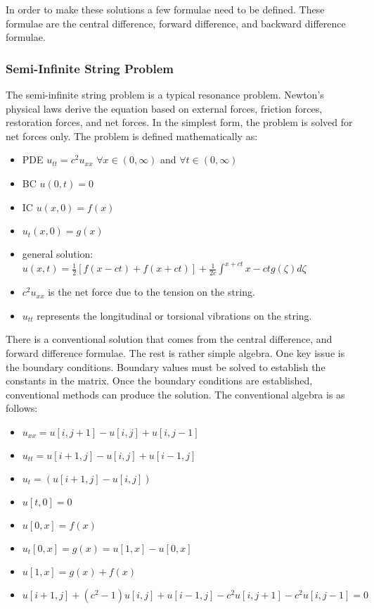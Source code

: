In order to make these solutions a few formulae need to be defined.  These formulae are the central difference, forward difference, and backward difference formulae. 


\subsubsection {Semi-Infinite String Problem}
The semi-infinite string problem is a typical resonance problem.  Newton's physical laws derive the equation based on external forces, friction forces, restoration forces, and net forces.   In the simplest form, the problem is solved for net forces only.  %
The problem is defined mathematically as:

\begin{itemize}
\item PDE $u_{tt} = c^2 u_{xx}$  $\forall x \in (0, \infty)$ and $\forall t \in (0,\infty)$ 
\item BC $u(0,t) = 0$
\item IC $u(x,0)= f(x)$
\item $u_t (x,0) = g(x)$
\item general solution: $ u(x,t) = \frac{1}{2} [ f(x-ct) + f(x+ct)] + \frac{1}{2c} \int ^{x+ct}{x-ct} g(\zeta) d\zeta$
\item $c^2 u_{xx} $ is the net force due to the tension on the string.
\item $u_{tt}$  represents the longitudinal or torsional vibrations on the string.
\end{itemize}

There is a conventional solution that comes from the central difference, and forward difference formulae.  The rest is rather simple algebra.  One key issue is the boundary conditions.  Boundary values must %
be solved to establish the constants in the matrix.  Once the boundary conditions %
are established, %
conventional methods can produce the solution.   The conventional algebra is as follows:

\begin{itemize}
\item $u_{xx} = u[i,j+1] - u[i,j] + u[i,j-1] $
\item $u_{tt} = u[i+1,j] - u[i,j] + u[i-1,j] $
\item $u_t = (u[i+1,j] - u[i,j]) $
\item $u[t,0] = 0 $
\item $u[0,x] = f(x) $
\item $u_t [0,x] = g(x) = u [1, x] - u[0,x] $
\item $u[1,x] = g(x) + f(x) $
\item $ u[i+1,j] + (c^2 - 1)u[i,j] + u[i-1,j] - c^2u[i,j+1]  - c^2 u[i,j-1] = 0 $
\end{itemize}



